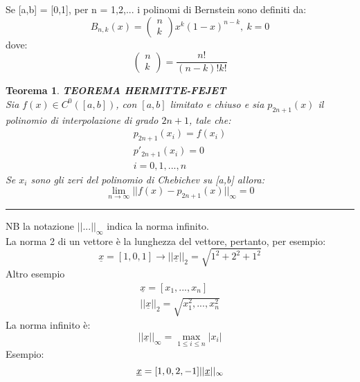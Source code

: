 \documentclass[a4paper, portrait]{book}
\numberwithin{equation}{chapter} %
\newtheorem{theorem}{Teorema}
\newcommand*\sepline{%
  \begin{center}
    \rule[1ex]{.5\textwidth}{.5pt}
  \end{center}}
\begin{document}
Se [a,b] = [0,1], per n = 1,2,... i polinomi di Bernstein sono definiti da:
\begin{equation}
    B_{n,k}(x) = \begin{pmatrix}
        n\\k
    \end{pmatrix}x^k (1-x)^{n-k}, \ k = 0
\end{equation}
dove:
\begin{equation}
    \begin{pmatrix}
        n\\k
    \end{pmatrix} = \frac{n!}{(n-k)!k!}
\end{equation}
\begin{theorem}
    \textbf{TEOREMA HERMITTE-FEJET}\\
    Sia $f(x) \in C^0([a,b])$, con $[a,b]$ limitato e chiuso e sia $p_{2n+1}(x)$ il polinomio di interpolazione di grado $2n + 1$, tale che:
    \begin{gather}
        p_{2n+1}(x_i) = f(x_i)\\
        p'_{2n+1}(x_i) = 0\\
        i = 0,1,...,n
    \end{gather}
    Se $x_i$ sono gli zeri del polinomio di Chebichev su [a,b] allora:
    \begin{equation}
        \lim_{n\rightarrow \infty} ||f(x) - p_{2n+1}(x)||_\infty = 0
    \end{equation}
\end{theorem}
\sepline{}
NB la notazione $||...||_\infty$ indica la norma infinito.\\
La norma 2 di un vettore è la lunghezza del vettore, pertanto, per esempio:
\begin{equation}
    \underline{x} = [1,0,1] \rightarrow ||\underline{x}||_2 = \sqrt{1^2 + 2^2 + 1^2}
\end{equation}
Altro esempio
\begin{gather}
    \underline{x} = [x_1,...,x_n]\\
    ||\underline{x}||_2 = \sqrt{x_1^2,...,x_n^2}
\end{gather}
La norma infinito è:
\begin{equation}
    ||\underline{x}||_\infty = \max_{1\leq i \leq n}|x_i|
\end{equation}
Esempio:
\begin{equation}
    \underline{x} = [1,0,2,-1]\\
    ||\underline{x}||_\infty
\end{equation}
\end{document}
